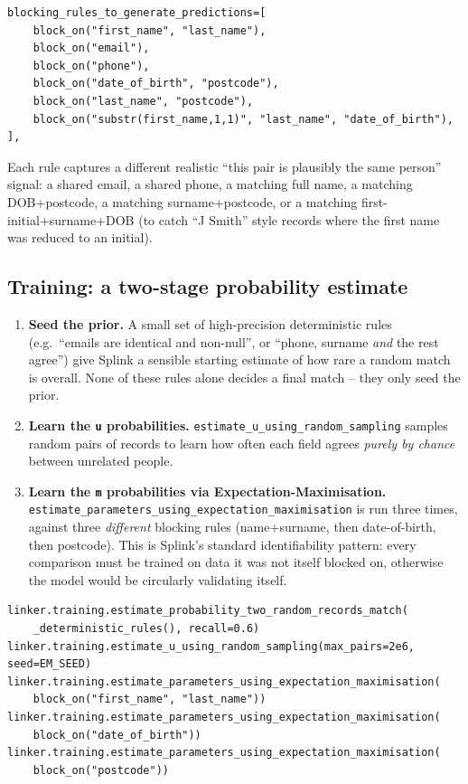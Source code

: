 \documentclass[11pt]{report}
\newcommand{\codeb}[1]{\texttt{\scriptsize #1}}
\begin{document}
\begin{lstlisting}[style=py, caption={Blocking rules (\texttt{splink\_service.py})}]
blocking_rules_to_generate_predictions=[
    block_on("first_name", "last_name"),
    block_on("email"),
    block_on("phone"),
    block_on("date_of_birth", "postcode"),
    block_on("last_name", "postcode"),
    block_on("substr(first_name,1,1)", "last_name", "date_of_birth"),
],
\end{lstlisting}

Each rule captures a different realistic ``this pair is plausibly the same person'' signal: a shared email, a shared phone, a matching full name, a matching DOB+postcode, a matching surname+postcode, or a matching first-initial+surname+DOB (to catch ``J Smith'' style records where the first name was reduced to an initial).

\subsection{Training: a two-stage probability estimate}

\begin{enumerate}
\item \textbf{Seed the prior.} A small set of high-precision deterministic rules (e.g.\ ``emails are identical and non-null'', or ``phone, surname \emph{and} the rest agree'') give Splink a sensible starting estimate of how rare a random match is overall. None of these rules alone decides a final match -- they only seed the prior.
\item \textbf{Learn the \texttt{u} probabilities.} \codeb{estimate\_u\_using\_random\_\allowbreak{}sampling} samples random pairs of records to learn how often each field agrees \emph{purely by chance} between unrelated people.
\item \textbf{Learn the \texttt{m} probabilities via Expectation-Maximisation.} \codeb{estimate\_parameters\_using\_\allowbreak{}expectation\_maximisation} is run three times, against three \emph{different} blocking rules (name+surname, then date-of-birth, then postcode). This is Splink's standard identifiability pattern: every comparison must be trained on data it was not itself blocked on, otherwise the model would be circularly validating itself.
\end{enumerate}

\begin{lstlisting}[style=py, caption={Training pipeline (\texttt{splink\_service.py}, \texttt{\_build\_and\_train\_linker()})}]
linker.training.estimate_probability_two_random_records_match(
    _deterministic_rules(), recall=0.6)
linker.training.estimate_u_using_random_sampling(max_pairs=2e6, seed=EM_SEED)
linker.training.estimate_parameters_using_expectation_maximisation(
    block_on("first_name", "last_name"))
linker.training.estimate_parameters_using_expectation_maximisation(
    block_on("date_of_birth"))
linker.training.estimate_parameters_using_expectation_maximisation(
    block_on("postcode"))
\end{lstlisting}
\end{document}
